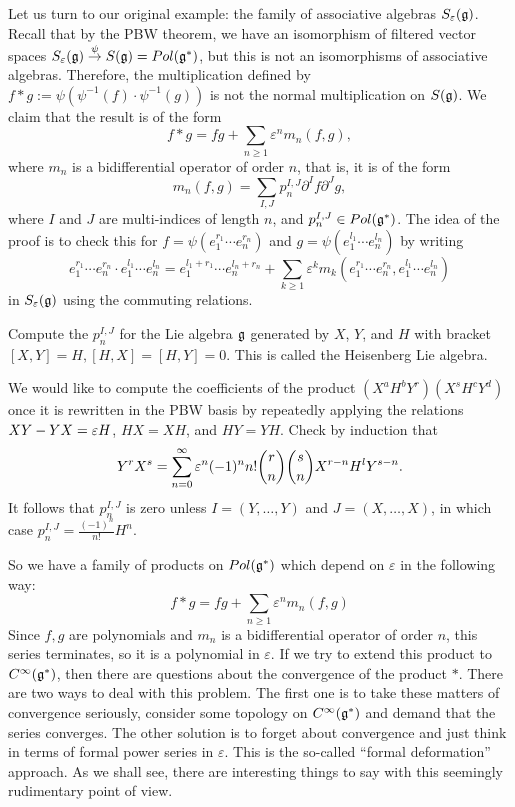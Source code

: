   Let us turn to our original example: the family of associative algebras
  $S_\varepsilon(\mathfrak{g})$. Recall that by the PBW theorem, we have an isomorphism of
  filtered vector spaces $S_\varepsilon(\mathfrak{g})\stackrel{\psi}{\to}S(\mathfrak{g})= Pol(\mathfrak{g}^*)$, but
  this is not an isomorphisms of associative algebras. Therefore, the multiplication
  defined by $f\ast g:=\psi(\psi^{-1}(f)\cdot \psi^{-1}(g))$ is not the normal
  multiplication on $S(\mathfrak{g})$. We claim that the result is of the form
  \[
     f\ast g = fg + \sum_{n\ge 1}\varepsilon^n m_n(f,g) ,
  \]
  where $m_n$ is a bidifferential operator of order $n$, that is, it is of the form
  \[
  m_n(f,g)=\sum_{I,J}p_n^{I,J} \partial^If\partial^Jg,
  \]
  where $I$ and $J$ are multi-indices of length $n$, and $p_n^{I,J}\in Pol(\mathfrak{g}^*)$. The
  idea of the proof is to check this for $f=\psi(e_1^{r_1}\cdots e_n^{r_n}) $ and
  $g=\psi(e_1^{l_1}\cdots e_n^{l_n})$ by writing
  \[
  e_1^{r_1}\cdots e_n^{r_n} \cdot e_1^{l_1}\cdots e_n^{l_n}=e_1^{l_1+r_1}\cdots
  e_n^{l_n+r_n} + \sum_{k\ge 1} \varepsilon^k m_k(e_1^{r_1}\cdots
  e_n^{r_n},e_1^{l_1}\cdots e_n^{l_n})
  \]
  in $S_\varepsilon(\mathfrak{g})$ using the commuting relations.

  \begin{exercise}
   Compute the $p_n^{I,J}$ for the Lie algebra $\mathfrak{g}$ generated by $X$, $Y$, and $H$
   with bracket $[X,Y]=H, [H,X]=[H,Y]=0$. This is called the Heisenberg Lie
   algebra.
   \begin{solution}
     We would like to compute the coefficients of the product $(X^aH^bY^r)(X^sH^cY^d)$
     once it is rewritten in the PBW basis by repeatedly applying the relations
     $XY-YX=\varepsilon H$, $HX=XH$, and $HY=YH$. Check by induction that
     \[
        Y^r X^s = \sum_{n=0}^\infty \varepsilon^n (-1)^n n! \binom{r}{n}\binom{s}{n}
        X^{r-n}H^lY^{s-n}.
     \]
     It follows that $p_n^{I,J}$ is zero unless $I=(Y,\dots, Y)$ and $J=(X,\dots,X)$,
     in which case $p_n^{I,J}=\frac{(-1)^n}{n!} H^n $.
   \end{solution}
  \end{exercise}

  So we have a family of products on $Pol(\mathfrak{g}^*)$ which depend on $\varepsilon$ in the
  following way:
  \[
   f\ast g = fg + \sum_{n\ge 1}\varepsilon^n m_n(f,g)
  \]
  Since $f,g$ are polynomials and $m_n$ is a bidifferential operator of order $n$,
  this series terminates, so it is a polynomial in $\varepsilon$. If we try to extend
  this product to $C^\infty(\mathfrak{g}^*)$, then there are questions about the convergence of
  the product $\ast$. There are two ways to deal with this problem. The first one is
  to take these matters of convergence seriously, consider some topology on
  $C^\infty(\mathfrak{g}^*)$ and demand that the series converges. The other solution is to
  forget about convergence and just think in terms of formal power series in
  $\varepsilon$. This is the so-called ``formal deformation'' approach. As we shall
  see, there are interesting things to say with this seemingly rudimentary point
  of view.

